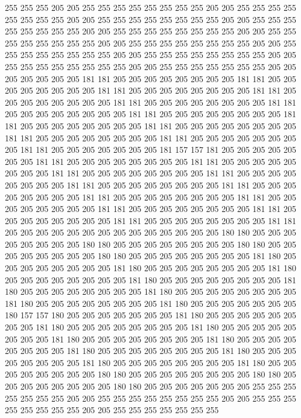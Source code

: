 255 255 255 205 205 255 255 255 255 255 255 255 255 205 205 255 255 255 255 255
255 255 255 205 205 255 255 255 255 255 255 255 255 205 205 255 255 255 255 255
255 255 255 205 205 255 255 255 255 255 255 255 255 205 205 255 255 255 255 255
255 255 255 205 205 255 255 255 255 255 255 255 255 205 205 255 255 255 255 255
255 255 255 205 205 255 255 255 255 255 255 255 255 205 205 255 255 255 255 255
255 255 255 205 205 255 255 255 255 255 255 255 205 205 205 205 205 205 205 181
181 205 205 205 205 205 205 205 205 181 181 205 205 205 205 205 205 205 205 181
181 205 205 205 205 205 205 205 205 181 181 205 205 205 205 205 205 205 205 181
181 205 205 205 205 205 205 205 205 181 181 205 205 205 205 205 205 205 205 181
181 205 205 205 205 205 205 205 205 181 181 205 205 205 205 205 205 205 205 181
181 205 205 205 205 205 205 205 205 181 181 205 205 205 205 205 205 205 205 181
181 205 205 205 205 205 205 205 205 181 181 205 205 205 205 205 205 205 181 157
157 181 205 205 205 205 205 205 205 181 181 205 205 205 205 205 205 205 205 181
181 205 205 205 205 205 205 205 205 181 181 205 205 205 205 205 205 205 205 181
181 205 205 205 205 205 205 205 205 181 181 205 205 205 205 205 205 205 205 181
181 205 205 205 205 205 205 205 205 181 181 205 205 205 205 205 205 205 205 181
181 205 205 205 205 205 205 205 205 181 181 205 205 205 205 205 205 205 205 181
181 205 205 205 205 205 205 205 205 181 181 205 205 205 205 205 205 205 205 181
181 205 205 205 205 205 205 205 205 205 205 205 205 205 205 180 180 205 205 205
205 205 205 205 205 180 180 205 205 205 205 205 205 205 205 180 180 205 205 205
205 205 205 205 205 180 180 205 205 205 205 205 205 205 205 181 180 205 205 205
205 205 205 205 205 181 180 205 205 205 205 205 205 205 205 181 180 205 205 205
205 205 205 205 205 181 180 205 205 205 205 205 205 205 205 181 180 205 205 205
205 205 205 205 205 181 180 205 205 205 205 205 205 205 205 181 180 205 205 205
205 205 205 205 205 181 180 205 205 205 205 205 205 205 180 157 157 180 205 205
205 205 205 205 205 181 180 205 205 205 205 205 205 205 205 181 180 205 205 205
205 205 205 205 205 181 180 205 205 205 205 205 205 205 205 181 180 205 205 205
205 205 205 205 205 181 180 205 205 205 205 205 205 205 205 181 180 205 205 205
205 205 205 205 205 181 180 205 205 205 205 205 205 205 205 181 180 205 205 205
205 205 205 205 205 181 180 205 205 205 205 205 205 205 205 180 180 205 205 205
205 205 205 205 205 180 180 205 205 205 205 205 205 205 205 180 180 205 205 205
205 205 205 205 255 255 255 255 255 255 255 205 205 255 255 255 255 255 255 255
255 205 205 255 255 255 255 255 255 255 255 205 205 255 255 255 255 255 255 255
